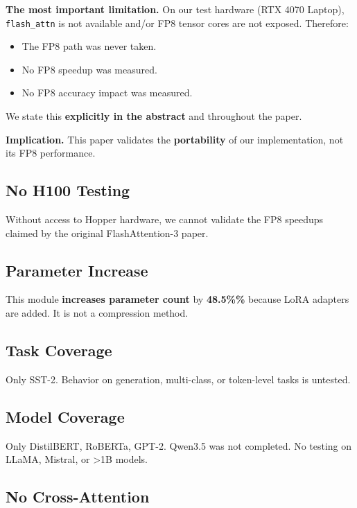 \textbf{The most important limitation.} On our test hardware (RTX 4070 Laptop), 
\texttt{flash\_attn} is not available and/or FP8 tensor cores are not exposed. 
Therefore:

\begin{itemize}
\item The FP8 path was never taken.
\item No FP8 speedup was measured.
\item No FP8 accuracy impact was measured.

\end{itemize}
We state this \textbf{explicitly in the abstract} and throughout the paper.

\textbf{Implication.} This paper validates the \textbf{portability} of our 
implementation, not its FP8 performance.

\subsection{No H100 Testing}

Without access to Hopper hardware, we cannot validate the FP8 speedups 
claimed by the original FlashAttention-3 paper.

\subsection{Parameter Increase}

This module \textbf{increases parameter count} by \textbf{48.5\%\%} because 
LoRA adapters are added. It is not a compression method.

\subsection{Task Coverage}

Only SST-2. Behavior on generation, multi-class, or token-level tasks 
is untested.

\subsection{Model Coverage}

Only DistilBERT, RoBERTa, GPT-2. Qwen3.5 was not completed. No testing on 
LLaMA, Mistral, or \textgreater{}1B models.

\subsection{No Cross-Attention}

